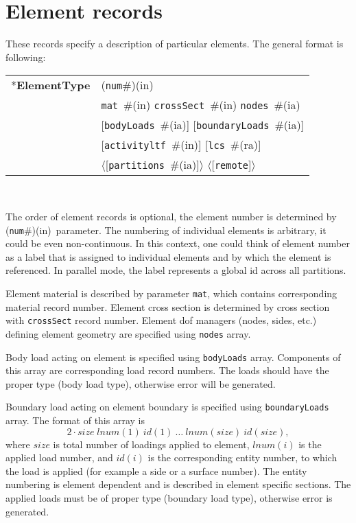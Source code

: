 \documentclass[a4paper]{report}
\newcommand{\param}[1]{\texttt{#1}} %
\newcommand{\optional}[1]{[#1]} %
\newcommand{\field}[2]{\param{#1}~\#{\tiny(#2)}} %
\newcommand{\optField}[2]{\optional{\field{#1}{#2}}}
\newcommand{\optFieldnotype}[1]{[\param{#1}]}
\newcommand{\componentNum}{(\param{num}\#){\tiny(in)}} %
\newcommand{\entKeyword}[1]{*\textbf{#1}} %
\newcommand{\Pmode}[1]{{\sffamily #1}}
\newcommand{\oofemParallel}[1]{$\langle${#1}$\rangle$}
\newcommand{\PoptField}[2]{\oofemParallel{\optField{#1}{#2}}}
\newcommand{\PoptFieldnotype}[1]{\oofemParallel{\optFieldnotype{#1}}}
\newenvironment{record}[1][]{\begin{tabular}{|ll}}{\end{tabular}\\}
\newcommand{\recentry}[2]{{#1}&{#2}\\}
\newcounter{rcc}
\newenvironment{record}[1][\textwidth]{\setcounter{rcc}{0}\rowcolors{1}{lightgray}{lightgray}\tabularx{#1}{llR} \hline}
               {\endtabularx}
\newcommand{\recentry}[2]{\ifthenelse{\value{rcc}>0}{$\backslash$ \\}{\setcounter{rcc}{1}}{#1}&{#2}&}
\begin{document}
\section{Element records}
\label{_ElementsRecords}
These records specify a description of particular elements. The
general format is following:

\noindent
\begin{record}
  \recentry{\entKeyword{ElementType}}{\componentNum}
  \recentry{}{\field{mat}{in} \field{crossSect}{in} \field{nodes}{ia}}
  \recentry{}{\optField{bodyLoads}{ia} \optField{boundaryLoads}{ia}}
  \recentry{}{\optField{activityltf}{in} \optField{lcs}{ra}}
  \recentry{}{\PoptField{partitions}{ia} \PoptFieldnotype{remote}}
\end{record}

The order of element records is optional, the element number is determined by \componentNum\ parameter.
The numbering of individual elements is arbitrary, it could be even non-continuous. In this context, one could think of element number as a label that is assigned to individual elements and by which the element is referenced.
\Pmode{In parallel mode, the label represents a global id across all partitions.}

Element
material is described by parameter \param{mat}, which contains corresponding
material record number. Element cross
section is determined by cross section  with  \param{crossSect}
record number. Element dof managers (nodes, sides, etc.) defining element geometry are specified using
\param{nodes} array.

Body load acting on element is specified using \param{bodyLoads} array. Components
of this array are corresponding load record numbers. The loads should
have the proper type (body load type), otherwise error will be generated.

Boundary load acting on element boundary is specified using
\param{boundaryLoads} array. The format of this array is
\begin{displaymath}
2\cdot size \; lnum(1)~id(1)~\dots~lnum(size)~id(size),
\end{displaymath}
where $size$ is total number of loadings applied to element,
$lnum(i)$ is the applied load number, and $id(i)$
is the corresponding entity number, to which the load is applied (for example
a side or a surface number). The entity numbering is element dependent and
is described in element specific sections. The applied loads must be
of proper type (boundary load type), otherwise error is generated.
\end{document}
